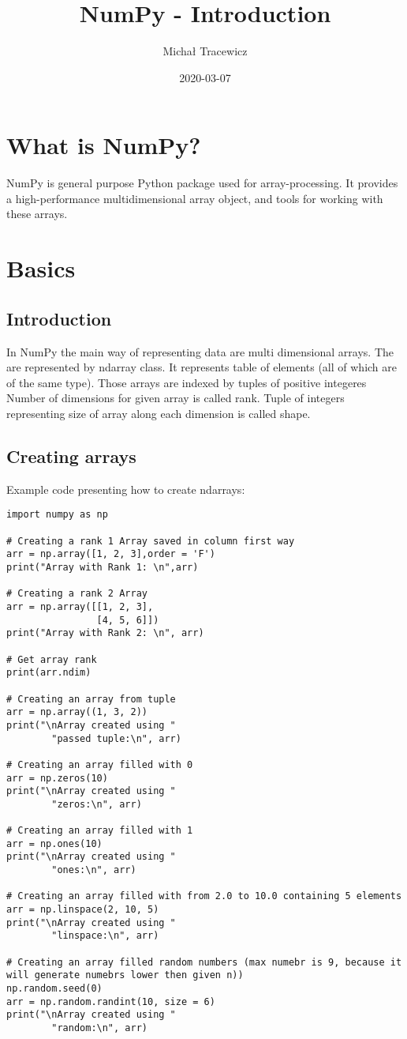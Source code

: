 \documentclass{article}
\title{NumPy - Introduction}
\author{Michał Tracewicz}
\date{2020-03-07}
\begin{document}
\maketitle
\newpage
{}
\section{What is NumPy?}
NumPy is general purpose Python package used for array-processing.
It provides a high-performance multidimensional array object, and tools for working with these arrays.
\section{Basics}
\subsection{Introduction}
In NumPy the main way of representing data are multi dimensional arrays.
The are represented by ndarray class. It represents table of elements (all of which are of the same type).
Those arrays are indexed by tuples of positive integeres
Number of dimensions for given array is called rank.
Tuple of integers representing size of array along each dimension is called shape.
\subsection{Creating arrays}
Example code presenting how to create ndarrays:
\begin{lstlisting}
import numpy as np

# Creating a rank 1 Array saved in column first way
arr = np.array([1, 2, 3],order = 'F')
print("Array with Rank 1: \n",arr)

# Creating a rank 2 Array
arr = np.array([[1, 2, 3],
                [4, 5, 6]])
print("Array with Rank 2: \n", arr)

# Get array rank
print(arr.ndim)

# Creating an array from tuple
arr = np.array((1, 3, 2))
print("\nArray created using "
        "passed tuple:\n", arr)

# Creating an array filled with 0
arr = np.zeros(10)
print("\nArray created using "
        "zeros:\n", arr)

# Creating an array filled with 1
arr = np.ones(10)
print("\nArray created using "
        "ones:\n", arr)

# Creating an array filled with from 2.0 to 10.0 containing 5 elements
arr = np.linspace(2, 10, 5)
print("\nArray created using "
        "linspace:\n", arr)

# Creating an array filled random numbers (max numebr is 9, because it will generate numebrs lower then given n))
np.random.seed(0)
arr = np.random.randint(10, size = 6)
print("\nArray created using "
        "random:\n", arr)
\end{lstlisting}
\end{document}
